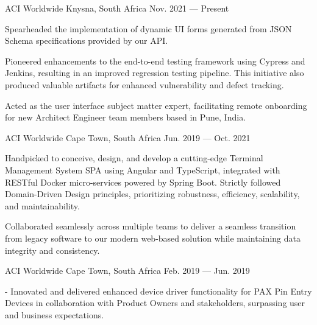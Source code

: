 
\begin{cventries}
  {ACI Worldwide}
  {Knysna, South Africa}
  {Nov. 2021 --- Present}
  {
    \begin{cvitems}
      \item {Spearheaded the implementation of dynamic UI forms generated from JSON Schema specifications provided by our API.}
      \item {
                  Pioneered enhancements to the end-to-end testing framework using Cypress and Jenkins, resulting in an improved
                  regression testing pipeline. This initiative also produced valuable artifacts for enhanced vulnerability and defect
                  tracking.
            }
      \item {
                  Acted as the user interface subject matter expert, facilitating remote onboarding for new Architect Engineer team members based in Pune,
                  India.
            }
    \end{cvitems}
  }

  {ACI Worldwide}
  {Cape Town, South Africa}
  {Jun. 2019 --- Oct. 2021}
  {
    \begin{cvitems}
      \item {Handpicked to conceive, design, and develop a cutting-edge
                  Terminal Management System SPA using Angular and TypeScript, integrated
                  with RESTful Docker micro-services powered by Spring Boot.}
            {Strictly followed Domain-Driven Design principles, prioritizing
                  robustness, efficiency, scalability, and maintainability.}
      \item {Collaborated seamlessly across multiple teams to deliver a
                  seamless transition from legacy software to our modern web-based solution
                  while maintaining data integrity and consistency.}
    \end{cvitems}
  }

  {ACI Worldwide}
  {Cape Town, South Africa}
  {Feb. 2019 --- Jun. 2019}
  {
    \begin{cvitems}
      \item {- Innovated and delivered enhanced device driver
                  functionality for PAX Pin Entry Devices in collaboration with Product
                  Owners and stakeholders, surpassing user and business expectations.}
    \end{cvitems}
  }

\end{cventries}
